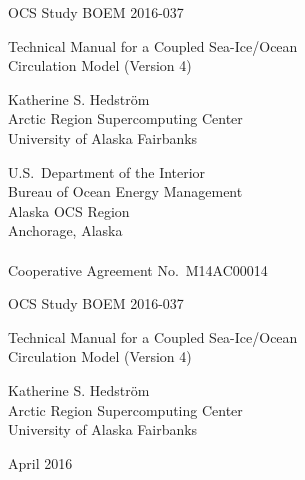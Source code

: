 %
%



\pagestyle{empty}
\centerline{\hfill OCS Study BOEM 2016-037}

\vspace {2 cm}
\begin{center}
  {\LARGE Technical Manual for a Coupled Sea-Ice/Ocean \\ Circulation
   Model (Version 4)  }
\end{center}
\vspace {2 cm}
\begin{center}
  Katherine S. Hedstr\"{o}m \\ Arctic Region Supercomputing Center
  \\ University of Alaska Fairbanks
\end{center}
\vspace {2 cm}
\begin{center}
  U.S.\ Department of the Interior \\ Bureau of Ocean Energy
  Management \\
  Alaska OCS Region \\
  Anchorage, Alaska \\ \mbox{} \\ Cooperative Agreement No.\ M14AC00014
\end{center}
\newpage

\centerline{\hfill OCS Study BOEM 2016-037}
\vspace {2 cm}
\begin{center}
  {\LARGE Technical Manual for a Coupled Sea-Ice/Ocean \\ Circulation
   Model (Version 4)  }
\end{center}
\vspace {2 cm}
\begin{center}
  Katherine S. Hedstr\"{o}m \\ Arctic Region Supercomputing Center
  \\ University of Alaska Fairbanks
\end{center}
\vspace {2 cm}
\centerline{April 2016}
\vfill


